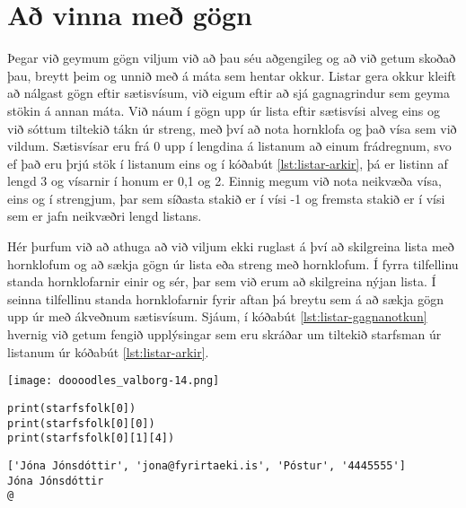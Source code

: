 \section{Að vinna með gögn}\label{uk:gagnavinnsla-listar}
Þegar við geymum gögn viljum við að þau séu aðgengileg og að við getum skoðað þau, breytt þeim og unnið með á máta sem hentar okkur.
Listar gera okkur kleift að nálgast gögn eftir sætisvísum, við eigum eftir að sjá gagnagrindur sem geyma stökin á annan máta.
Við náum í gögn upp úr lista eftir sætisvísi alveg eins og við sóttum tiltekið tákn úr streng, með því að nota hornklofa og það vísa sem við vildum.
Sætisvísar eru frá 0 upp í lengdina á listanum að einum frádregnum, svo ef það eru þrjú stök í listanum eins og í kóðabút \ref{lst:listar-arkir}, þá er listinn af lengd 3 og vísarnir í honum er 0,1 og 2.
Einnig megum við nota neikvæða vísa, eins og í strengjum, þar sem síðasta stakið er í vísi -1 og fremsta stakið er í vísi sem er jafn neikvæðri lengd listans.

Hér þurfum við að athuga að við viljum ekki ruglast á því að skilgreina lista með hornklofum og að sækja gögn úr lista eða streng með hornklofum.
Í fyrra tilfellinu standa hornklofarnir einir og sér, þar sem við erum að skilgreina nýjan lista.
Í seinna tilfellinu standa hornklofarnir fyrir aftan þá breytu sem á að sækja gögn upp úr með ákveðnum sætisvísum.
Sjáum, í kóðabút \ref{lst:listar-gagnanotkun} hvernig við getum fengið upplýsingar sem eru skráðar um tiltekið starfsman úr listanum úr kóðabút \ref{lst:listar-arkir}.

\begin{center}
	\texttt{[image: doooodles\_valborg-14.png]}
\end{center}
\newpage
\begin{lstlisting}[caption=Unnið með gögn úr lista, label=lst:listar-gagnanotkun]
print(starfsfolk[0])
print(starfsfolk[0][0])
print(starfsfolk[0][1][4])
\end{lstlisting}
\lstset{style=uttak}
\begin{lstlisting}
['Jóna Jónsdóttir', 'jona@fyrirtaeki.is', 'Póstur', '4445555']
Jóna Jónsdóttir
@
\end{lstlisting}
\lstset{style=venjulegt}

